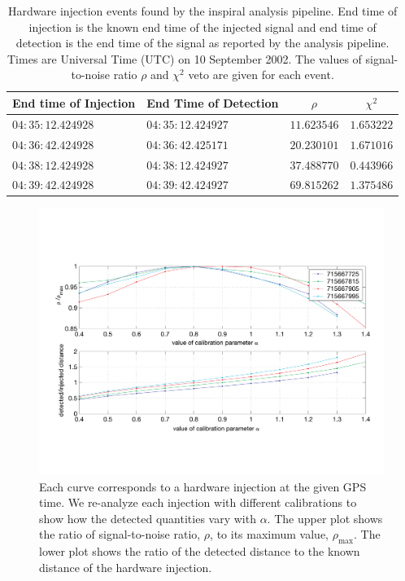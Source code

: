 \begin{table}[p]
  \begin{flushright}
  \begin{tabular}{l|l|c|c}
  End time of Injection&End Time of Detection&$\rho$&$\chi^2$\\
  \hline
  $04:35:12.424928$ & $04:35:12.424927$ & $11.623546$ & $1.653222$ \\
  $04:36:42.424928$ & $04:36:42.425171$ & $20.230101$ & $1.671016$ \\
  $04:38:12.424928$ & $04:38:12.424927$ & $37.488770$ & $0.443966$ \\
  $04:39:42.424928$ & $04:39:42.424927$ & $69.815262$ & $1.375486$ \\
  \end{tabular}
  \end{flushright}
  \caption[Hardware Injections Found by the Analysis Pipeline]{%
\label{t:triggers}
  Hardware injection events found by the inspiral analysis pipeline. End time
  of injection is the known end time of the injected signal and end time of
  detection is the end time of the signal as reported by the analysis
  pipeline. Times are Universal Time (UTC) on 10 September 2002. The values of
  signal-to-noise ratio $\rho$ and $\chi^2$ veto are given for each event.
  }
\end{table}

\begin{figure}[p]
  \vspace{5pt}
  \begin{flushright}
    \includegraphics[width=\textwidth]{figures/hardware/calibration}    
  \end{flushright}
  \caption[Study of Calibration Using Hardware Injections]{%
\label{f:calibration}
  Each curve corresponds to a hardware injection at the given GPS time. We
  re-analyze each injection with different calibrations to show how the
  detected quantities vary with $\alpha$. The upper plot shows the ratio of
  signal-to-noise ratio, $\rho$, to its maximum value, $\rho_{\mathrm{max}}$.
  The lower plot shows the ratio of the detected distance to the known distance of
  the hardware injection.
  }
\end{figure}

